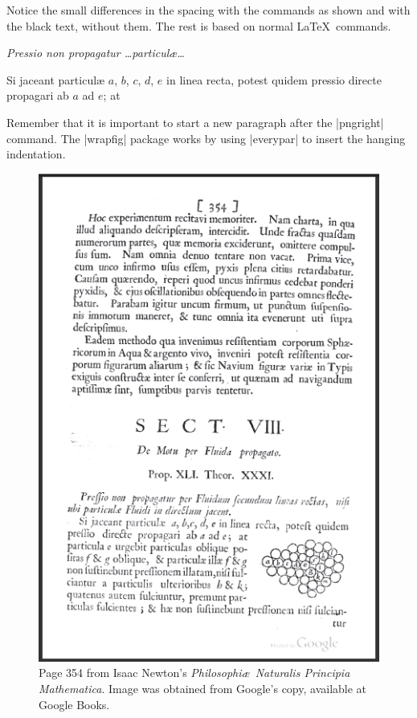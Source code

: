 \vspace*{-37pt}


Notice the small differences in the spacing with the commands as shown and with the black text, without them. The rest is based on normal \LaTeX\ commands.

\textit{Pressio non propagatur \ldots particul{\ae}\ldots}


Si jaceant particul{\ae} $a$, $b$, $c$, $d$,
$e$ in linea recta, potest quidem
pressio directe propagari ab $a$ ad $e$; at


Remember that it is important to start a new paragraph after the 
|pngright| command. The |wrapfig| package works by using |everypar| to insert the hanging indentation.

\begin{figure}[p]
\centering
\includegraphics[scale=1]{./images/page354.png}
\caption{Page 354 from Isaac Newton's \textit{Philosophi\ae\  Naturalis Principia Mathematica}. Image was obtained from Google's copy, available at Google Books.}
\label{fig:principia}
\end{figure}
